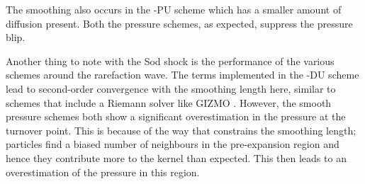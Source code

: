 The smoothing also occurs in the \anarchy{}-PU scheme which has a smaller amount of
diffusion present. Both the pressure schemes, as expected, suppress the pressure
blip.

Another thing to note with the Sod shock is the performance of the various
schemes around the rarefaction wave. The terms implemented in the \anarchy{}-DU
scheme lead to second-order convergence with the smoothing length here,
similar to schemes that include a Riemann solver like GIZMO
\citep{Hopkins2015, Price2018}. However, the smooth pressure schemes both show a
significant overestimation in the pressure at the turnover point. This is
because of the way that \swift{} constrains the smoothing length; particles
find a biased number of neighbours in the pre-expansion region and hence they
contribute more to the kernel than expected. This then leads to an
overestimation of the pressure in this region.